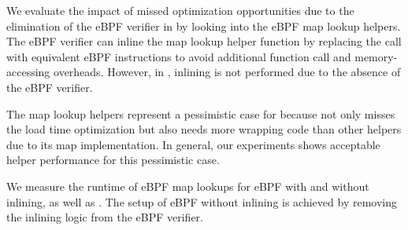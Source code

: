 We evaluate the impact of missed optimization opportunities due to the elimination of
    the eBPF verifier in \projname{} by looking into the eBPF map lookup
    helpers.
The eBPF verifier can inline the map lookup
    helper function by replacing the call with equivalent eBPF instructions to
    avoid additional function call and memory-accessing overheads.
However, in \projname{}, inlining is not performed due to the absence of the
    eBPF verifier. %

The map lookup helpers represent a pessimistic case for \projname{} because
    \projname{} not only misses the load time optimization but also needs more
    wrapping code than other helpers due to its map implementation.
In general, our experiments shows acceptable helper performance for this
    pessimistic case.


We measure the runtime of eBPF map lookups for eBPF with and without inlining,
    as well as \projname{}.
The setup of eBPF without inlining is achieved by removing the inlining logic
    from the eBPF verifier.

